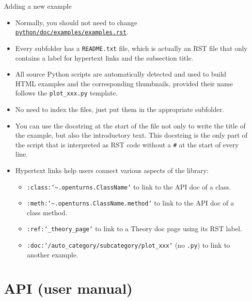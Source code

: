 \documentclass[8pt, handout]{beamer}
\begin{document}
\begin{frame}{Adding a new example}
\begin{itemize}
    \item Normally, you should not need to change \href{https://github.com/openturns/openturns/blob/master/python/doc/examples/examples.rst}{\texttt{python/doc/examples/examples.rst}}.
    \item Every subfolder has a \alert{\texttt{README.txt}} file, which is actually an RST file that only contains a label for hypertext links and the subsection title.
    \item All source Python scripts are \alert{automatically detected} and used to build HTML examples and the corresponding thumbnails, provided their name follows the \texttt{plot\_xxx.py} template.
    \item \alert{No need to index the files}, just put them in the appropriate subfolder.
    \item You can use the \alert{docstring} at the start of the file not only to write the title of the example, but also the introductory text. This docstring is the only part of the script that is interpreted as RST code without a \alert{\texttt{\#}} at the start of every line.
    \item \alert{Hypertext links} help users connect various aspects of the library:
    \begin{itemize}
        \item \texttt{:class:`\textasciitilde.openturns.ClassName`} to link to the API doc of a class.
        \item \texttt{:meth:`\textasciitilde.openturns.ClassName.method`} to link to the API doc of a class method.
        \item \texttt{:ref:`\_theory\_page`} to link to a Theory doc page using its RST label.
        \item \texttt{:doc:`/auto\_category/subcategory/plot\_xxx`} (no \texttt{.py}) to link to another example.
    \end{itemize}
\end{itemize}
\end{frame}



\section{API (user manual)}

\end{document}
